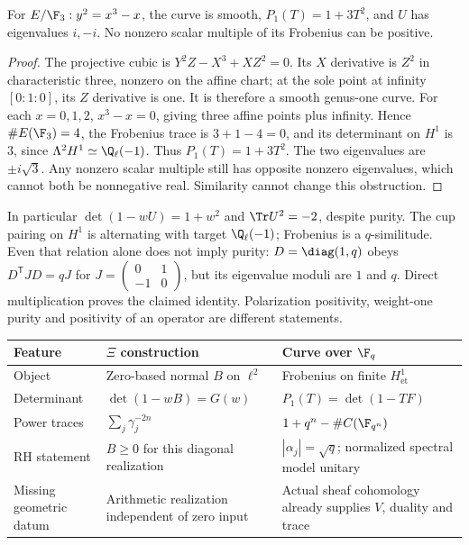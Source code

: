 \begin{proposition}
For $E/\F_3:y^2=x^3-x$, the curve is smooth, $P_1(T)=1+3T^2$, and $U$ has eigenvalues $i,-i$. No nonzero scalar multiple of its Frobenius can be positive.
\end{proposition}
\begin{proof}
The projective cubic is $Y^2Z-X^3+XZ^2=0$. Its $X$ derivative is $Z^2$ in characteristic three, nonzero on the affine chart; at the sole point at infinity $[0:1:0]$, its $Z$ derivative is one. It is therefore a smooth genus-one curve. For each $x=0,1,2$, $x^3-x=0$, giving three affine points plus infinity. Hence $\#E(\F_3)=4$, the Frobenius trace is $3+1-4=0$, and its determinant on $H^1$ is $3$, since $\Lambda^2H^1\simeq\Q_\ell(-1)$. Thus $P_1(T)=1+3T^2$. The two eigenvalues are $\pm i\sqrt3$. Any nonzero scalar multiple still has opposite nonzero eigenvalues, which cannot both be nonnegative real. Similarity cannot change this obstruction.
\end{proof}
In particular $\det(1-wU)=1+w^2$ and $\Tr U^2=-2$, despite purity. The cup pairing on $H^1$ is alternating with target $\Q_\ell(-1)$; Frobenius is a $q$-similitude. Even that relation alone does not imply purity: $D=\diag(1,q)$ obeys $D^{\mathsf T}JD=qJ$ for $J=\left(\begin{smallmatrix}0&1\\-1&0\end{smallmatrix}\right)$, but its eigenvalue moduli are $1$ and $q$. Direct multiplication proves the claimed identity. Polarization positivity, weight-one purity and positivity of an operator are different statements.

\begin{center}\small
\begin{tabular}{p{}p{}p{}}
\toprule
Feature & $\Xi$ construction & Curve over $\F_q$\\\midrule
Object & Zero-based normal $B$ on $\ell^2$ & Frobenius on finite $H^1_{\mathrm{et}}$\\
Determinant & $\det(1-wB)=G(w)$ & $P_1(T)=\det(1-TF)$\\
Power traces & $\sum_j\gamma_j^{-2n}$ & $1+q^n-\#C(\F_{q^n})$\\
RH statement & $B\ge0$ for this diagonal realization & $|\alpha_j|=\sqrt q$; normalized spectral model unitary\\
Missing geometric datum & Arithmetic realization independent of zero input & Actual sheaf cohomology already supplies $V$, duality and trace\\\bottomrule
\end{tabular}\end{center}

